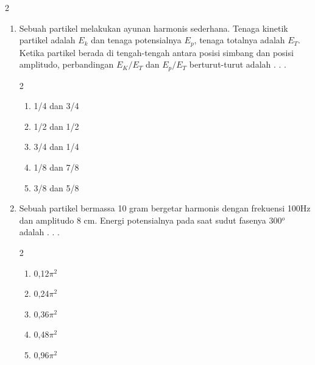 \documentclass[10pt,a4paper]{extarticle}
\newcommand{\pilgani}[1]{                            \vspace{-0.3cm}\begin{multicols}{2}
 \begin{enumerate}[label=\Alph*., itemsep=0pt,topsep=0pt,leftmargin=*,align=Center]#1                     \end{enumerate}
 \phantom{ini cuma sapi, wedus, dan ayam}
 \end{multicols}}
\begin{document}
\begin{multicols*}{2}
\begin{enumerate}
\item Sebuah partikel melakukan ayunan harmonis sederhana. Tenaga kinetik partikel adalah $E_k$ dan tenaga potensialnya $E_p$, tenaga totalnya adalah $E_T$. Ketika partikel berada di tengah-tengah antara posisi simbang dan posisi amplitudo, perbandingan $E_K/E_T$ dan $E_p/E_T$ berturut-turut adalah . . .
\pilgani{
   \item 1/4 dan 3/4
   \item 1/2 dan 1/2
   \item 3/4 dan 1/4
   \item 1/8 dan 7/8
   \item 3/8 dan 5/8
}
\vspace{3cm}

\item Sebuah partikel bermassa 10 gram bergetar harmonis dengan frekuensi 100Hz dan amplitudo 8 cm. Energi potensialnya pada saat sudut fasenya 300$^o$ adalah . . . 
\pilgani{
   \item 0,12$\pi^2$
   \item 0,24$\pi^2$
   \item 0,36$\pi^2$
   \item 0,48$\pi^2$
   \item 0,96$\pi^2$}
\vspace{3cm}


   
   
   \end{enumerate} \end{multicols*}
\end{document}
